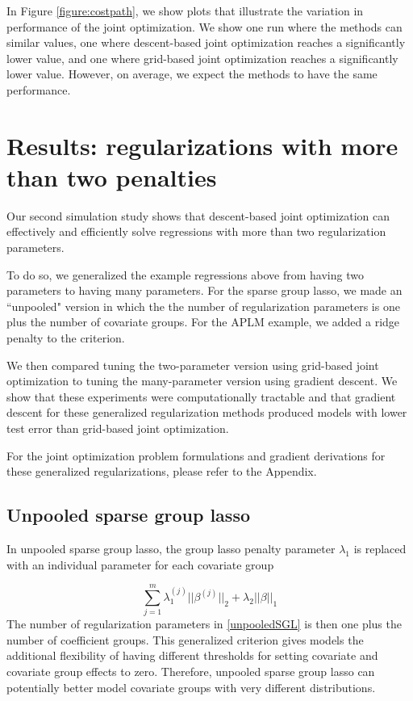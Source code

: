 \documentclass[10pt,letterpaper]{article}
\begin{document}
In Figure \ref{figure:costpath}, we show plots that illustrate the variation in performance of the joint optimization. We show one run where the methods can similar values, one where descent-based joint optimization reaches a significantly lower value, and one where grid-based joint optimization reaches a significantly lower value. However, on average, we expect the methods to have the same performance.

\section{Results: regularizations with more than two penalties}

Our second simulation study shows that descent-based joint optimization can effectively and efficiently solve regressions with more than two regularization parameters.

To do so, we generalized the example regressions above from having two parameters to having many parameters. For the sparse group lasso, we made an ``unpooled" version in which the the number of regularization parameters is one plus the number of covariate groups. For the APLM example, we added a ridge penalty to the criterion.

We then compared tuning the two-parameter version using grid-based joint optimization to tuning the many-parameter version using gradient descent. We show that these experiments were computationally tractable and that gradient descent for these generalized regularization methods produced models with lower test error than grid-based joint optimization.

For the joint optimization problem formulations and gradient derivations for these generalized regularizations, please refer to the Appendix.

\subsection{Unpooled sparse group lasso}

In unpooled sparse group lasso, the group lasso penalty parameter $\lambda_1$ is replaced with an individual parameter for each covariate group

\begin{equation}
\sum_{j=1}^m \lambda_1^{(j)} \lvert\lvert \beta^{(j)} \rvert \rvert_2
+ \lambda_2 \lvert\lvert \beta \rvert \rvert_1
\label{unpooledSGL}
\end{equation}
The number of regularization parameters in \eqref{unpooledSGL} is then one plus the number of coefficient groups. This generalized criterion gives models the additional flexibility of having different thresholds for setting covariate and covariate group effects to zero. Therefore, unpooled sparse group lasso can potentially better model covariate groups with very different distributions.
\end{document}
